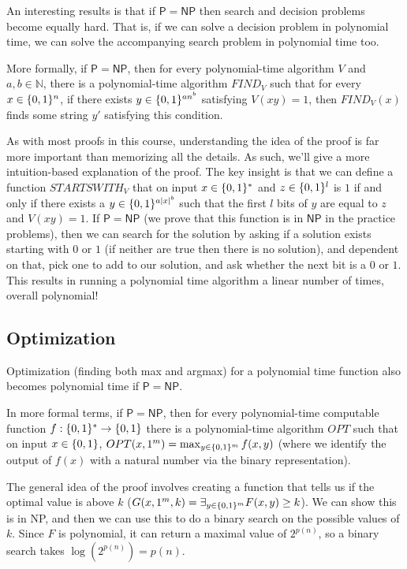 \documentclass[10pt]{article}
\begin{document}
An interesting results is that if $\mathsf{P}=\mathsf{NP}$ then search and decision problems become equally hard. That is, if we can solve a decision problem in polynomial time, we can solve the accompanying search problem in polynomial time too.

More formally, if $\mathsf{P}=\mathsf{NP}$, then for every polynomial-time algorithm $V$ and $a,b \in \mathbb{N}$, there is a polynomial-time algorithm $FIND_V$ such that for every $x\in \{0,1\}^n$, if there exists $y\in \{0,1\}^{an^b}$ satisfying $V(xy)=1$, then $FIND_V(x)$ finds some string $y'$ satisfying this condition.

As with most proofs in this course, understanding the idea of the proof is far more important than memorizing all the details. As such, we'll give a more intuition-based explanation of the proof. The key insight is that we can define a function $STARTSWITH_V$ that on input $x\in \{0,1\}^*$ and $z\in \{0,1\}^l$ is $1$ if and only if there exists a $y\in \{0,1\}^{a|x|^b}$ such that the first $l$ bits of $y$ are equal to $z$ and $V(xy)=1$. If $\mathsf{P}=\mathsf{NP}$ (we prove that this function is in $\mathsf{NP}$ in the practice problems), then we can search for the solution by asking if a solution exists starting with $0$ or $1$ (if neither are true then there is no solution), and dependent on that, pick one to add to our solution, and ask whether the next bit is a $0$ or $1$. This results in running a polynomial time algorithm a linear number of times, overall polynomial!

\subsection{Optimization}

Optimization (finding both max and argmax) for a polynomial time function also becomes polynomial time if $\mathsf{P} = \mathsf{NP}$.

In more formal terms, if $\mathsf{P}=\mathsf{NP}$, then for every polynomial-time computable function $f:\{0,1\}^* \rightarrow \{0,1\}$ there is a polynomial-time algorithm $OPT$ such that on input $x\in \{0,1\}$, $OPT(x,1^m) = \max_{y\in \{0,1\}^m} f(x,y)$ (where we identify the output of $f(x)$ with a natural number via the binary representation).

The general idea of the proof involves creating a function that tells us if the optimal value is above $k$ ($G(x,1^m,k) = \exists_{y\in \{0,1\}^m}F(x,y)\geq k$). We can show this is in NP, and then we can use this to do a binary search on the possible values of $k$. Since $F$ is polynomial, it can return a maximal value of $2^{p(n)}$, so a binary search takes $\log(2^{p(n)}) = p(n)$.
\end{document}

